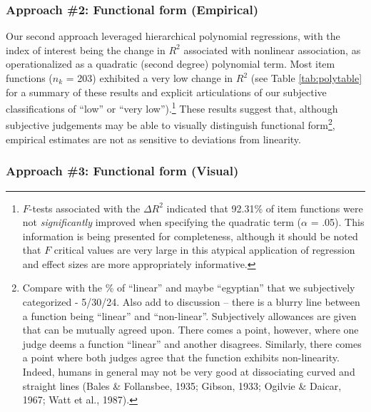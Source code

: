 \documentclass[
  ,jou]{apa6}
\begin{document}
\hypertarget{approach-2-functional-form-empirical}{%
\subsubsection{Approach \#2: Functional form (Empirical)}\label{approach-2-functional-form-empirical}}

Our second approach leveraged hierarchical polynomial regressions, with the index of interest being the change in \(R^2\) associated with nonlinear association, as operationalized as a quadratic (second degree) polynomial term. Most item functions (\(n_k\) = 203) exhibited a very low change in \(R^2\) (see Table \ref{tab:polytable} for a summary of these results and explicit articulations of our subjective classifications of ``low'' or ``very low'').\footnote{\(F\)-tests associated with the \(\Delta R^2\) indicated that 92.31\% of item functions were not \emph{significantly} improved when specifying the quadratic term (\(\alpha\) = .05). This information is being presented for completeness, although it should be noted that \(F\) critical values are very large in this atypical application of regression and effect sizes are more appropriately informative.} These results suggest that, although subjective judgements may be able to visually distinguish functional form\footnote{Compare with the \% of ``linear'' and maybe ``egyptian'' that we subjectively categorized - 5/30/24. Also add to discussion -- there is a blurry line between a function being ``linear'' and ``non-linear''. Subjectively allowances are given that can be mutually agreed upon. There comes a point, however, where one judge deems a function ``linear'' and another disagrees. Similarly, there comes a point where both judges agree that the function exhibits non-linearity. Indeed, humans in general may not be very good at dissociating curved and straight lines (Bales \& Follansbee, 1935; Gibson, 1933; Ogilvie \& Daicar, 1967; Watt et al., 1987).}, empirical estimates are not as sensitive to deviations from linearity.

\hypertarget{approach-3-functional-form-visual}{%
\subsubsection{Approach \#3: Functional form (Visual)}\label{approach-3-functional-form-visual}}
\end{document}
